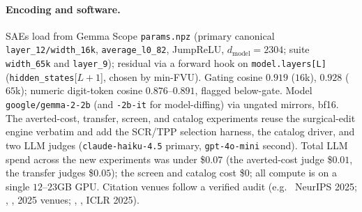 \documentclass[11pt,letterpaper]{article}
\begin{document}
\paragraph{Encoding and software.} SAEs load from Gemma Scope \texttt{params.npz} (primary canonical \texttt{layer\_12/}\allowbreak\texttt{width\_16k}, \texttt{average\_l0\_82}, JumpReLU, $d_{\text{model}}{=}2304$; suite \texttt{width\_65k} and \texttt{layer\_9}); residual via a forward hook on \texttt{model.layers[L]} (\texttt{hidden\_states}[$L{+}1$], chosen by min-FVU). Gating cosine $0.919$ ($16$k), $0.928$ ($65$k); numeric digit-token cosine $0.876$--$0.891$, flagged below-gate. Model \texttt{google/gemma-2-2b} (and \texttt{-2b-it} for model-diffing) via ungated mirrors, bf16. The averted-cost, transfer, screen, and catalog experiments reuse the surgical-edit engine verbatim and add the SCR/TPP selection harness, the catalog driver, and two LLM judges (\texttt{claude-haiku-4.5} primary, \texttt{gpt-4o-mini} second). Total LLM spend across the new experiments was under \$$0.07$ (the averted-cost judge \$$0.01$, the transfer judges \$$0.05$); the screen and catalog cost \$$0$; all compute is on a single $12$--$23$GB GPU. Citation venues follow a verified audit (e.g.\ \citet{Chanin2024} NeurIPS 2025; \citet{Wu2025}, \citet{Karvonen2025}, \citet{Gallifant2025} 2025 venues; \citet{Leask2025}, \citet{Lee2024}, \citet{Marks2024} ICLR 2025).



\end{document}
